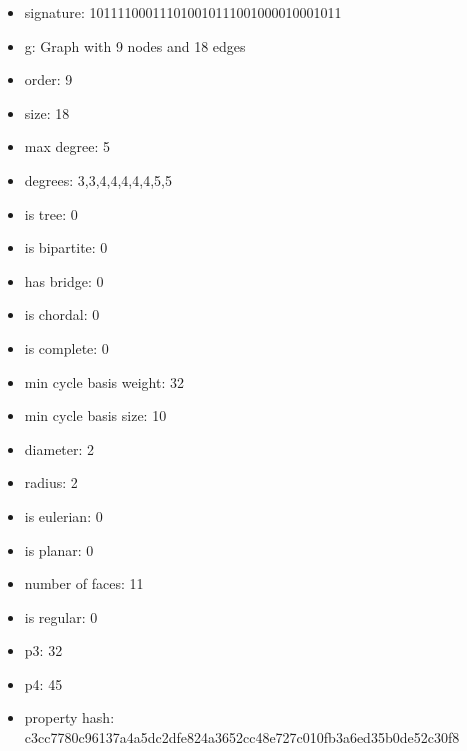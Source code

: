 \newpage
\begin{figure}
\end{figure}
\begin{itemize}
\item signature: 101111000111010010111001000010001011
\item g: Graph with 9 nodes and 18 edges
\item order: 9
\item size: 18
\item max degree: 5
\item degrees: 3,3,4,4,4,4,4,5,5
\item is tree: 0
\item is bipartite: 0
\item has bridge: 0
\item is chordal: 0
\item is complete: 0
\item min cycle basis weight: 32
\item min cycle basis size: 10
\item diameter: 2
\item radius: 2
\item is eulerian: 0
\item is planar: 0
\item number of faces: 11
\item is regular: 0
\item p3: 32
\item p4: 45
\item property hash: c3cc7780c96137a4a5dc2dfe824a3652cc48e727c010fb3a6ed35b0de52c30f8
\end{itemize}
